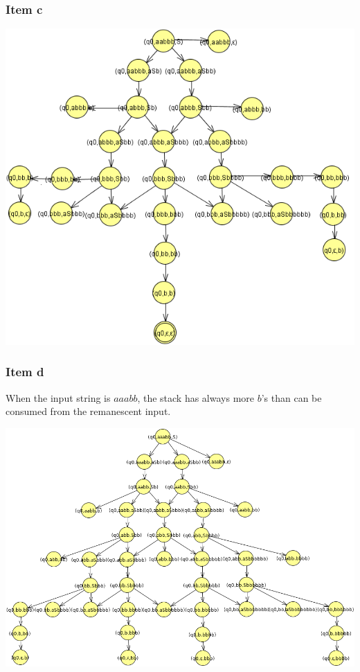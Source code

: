 {\subsubsection{Item c}
\begin{center} \includegraphics[scale=0.45]{TP09_1c} \end{center}
\pagebreak
\subsubsection{Item d}
When the input string is $aaabb$, the stack has always more $b$'s than can be consumed from the remanescent input.
\begin{center} \includegraphics[scale=0.45]{TP09_1d} \end{center}
}
